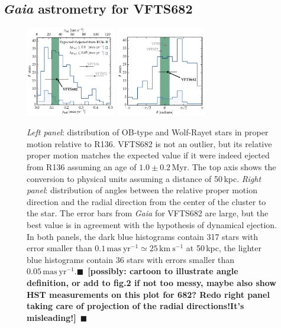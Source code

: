 \documentclass[apjl,twocolumn]{emulateapj}
\newcommand{\todo}[1]{{\large $\blacksquare$~\textbf{\color{red}[#1]}}~$\blacksquare$}
\newcommand{\SdM}[1]{{{\color{brown}{#1}}}}
\begin{document}


\subsection{ \emph{Gaia} astrometry for VFTS682\label{data:gaia}}

\begin{figure}[htbp]
  \centering
  \includegraphics[width=0.35\textwidth]{figures/dist_mu_region.pdf}
  \includegraphics[width=0.35\textwidth]{figures/angle}
  \caption{\emph{Left panel}: distribution of OB-type and Wolf-Rayet stars in proper
    motion relative to R136. VFTS682 is not an outlier, but
    its relative proper motion matches the expected value if it were indeed
    ejected from R136 assuming an age of $1.0\pm0.2$\,Myr. The top axis shows the conversion to physical units
    assuming a distance of 50\,kpc. \emph{Right panel}:  distribution of
    angles between the relative proper motion direction and the radial
    direction from the center of the cluster to the star. The error bars from \emph{Gaia} for VFTS682 are large, but
    the best value is in agreement with the hypothesis of dynamical
    ejection. In both
    panels, the dark blue histograms contain 317 
    stars with error smaller than $0.1\,\mathrm{mas \
      yr^{-1}}\simeq25\,\mathrm{km\ s^{-1}}$ at 50\,kpc, the
    lighter blue histograms contain 36 stars with errors smaller than $0.05\,\mathrm{mas \
      yr^{-1}}$.\todo{possibly: cartoon to illustrate angle definition, or add to
    fig.2 if not too messy, maybe also show HST measurements on this
    plot for 682? Redo right panel taking care of projection of the
    radial directions!It's misleading!}}
  \label{fig:dist}
\end{figure}
\end{document}
